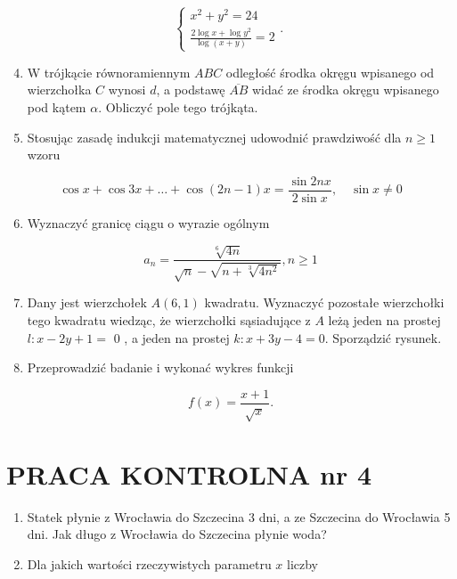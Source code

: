 \documentclass[10pt]{article}
\begin{document}
$$
\left\{\begin{array}{l}
x^{2}+y^{2}=24 \\
\frac{2 \log x+\log y^{2}}{\log (x+y)}=2
\end{array}\right. \text {. }
$$

\begin{enumerate}
  \setcounter{enumi}{3}
  \item W trójkącie równoramiennym $A B C$ odległość środka okręgu wpisanego od wierzchołka $C$ wynosi $d$, a podstawę $\overline{A B}$ widać ze środka okręgu wpisanego pod kątem $\alpha$. Obliczyć pole tego trójkąta.
  \item Stosując zasadę indukcji matematycznej udowodnić prawdziwość dla $n \geqslant 1$ wzoru
\end{enumerate}

$$
\cos x+\cos 3 x+\ldots+\cos (2 n-1) x=\frac{\sin 2 n x}{2 \sin x}, \quad \sin x \neq 0
$$

\begin{enumerate}
  \setcounter{enumi}{5}
  \item Wyznaczyć granicę ciągu o wyrazie ogólnym
\end{enumerate}

$$
a_{n}=\frac{\sqrt[6]{4 n}}{\sqrt{n}-\sqrt{n+\sqrt[3]{4 n^{2}}}}, n \geqslant 1
$$

\begin{enumerate}
  \setcounter{enumi}{6}
  \item Dany jest wierzchołek $A(6,1)$ kwadratu. Wyznaczyć pozostałe wierzchołki tego kwadratu wiedząc, że wierzchołki sąsiadujące z $A$ leżą jeden na prostej $l: x-2 y+1=$ 0 , a jeden na prostej $k: x+3 y-4=0$. Sporządzić rysunek.
  \item Przeprowadzić badanie i wykonać wykres funkcji
\end{enumerate}

$$
f(x)=\frac{x+1}{\sqrt{x}} .
$$

\section*{PRACA KONTROLNA nr 4}
\begin{enumerate}
  \item Statek płynie z Wrocławia do Szczecina 3 dni, a ze Szczecina do Wrocławia 5 dni. Jak długo z Wrocławia do Szczecina płynie woda?
  \item Dla jakich wartości rzeczywistych parametru $x$ liczby
\end{enumerate}
\end{document}
